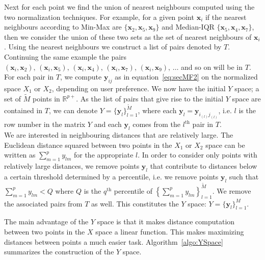 \documentclass[11pt]{article}
\begin{document}
Next for each point we find the union of nearest neighbours computed using the two normalization techniques. For example, for a given point $\bm{x}_i$ if the nearest neighbours according to Min-Max are $\{\bm{x}_2, \bm{x}_5, \bm{x}_9 \}$ and Median-IQR   $\{\bm{x}_5, \bm{x}_4, \bm{x}_7 \}$, then we consider the union of these two sets as the set of nearest neighbours of $\bm{x}_i$. Using the nearest neighbours we construct a list of pairs denoted by $T$. Continuing the same example the pairs $(\bm{x}_i, \bm{x}_2), \,  (\bm{x}_i, \bm{x}_5), \, (\bm{x}_i, \bm{x}_4), \,  (\bm{x}_i, \bm{x}_7), \, (\bm{x}_i, \bm{x}_9), \, \ldots $ and so on will be in $T$. \\

For each pair in $T$, we compute $\bm{y}_{ij}$ as in equation~\eqref{eq:secMF2} on the normalized space $X_1$ or $X_2$, depending on user preference. We now have the initial $Y$ space; a set of $\tilde{M}$ points in $\mathbb{R}^{p+}$. As the list of pairs that give rise to the initial $Y$ space are contained in $T$, we can denote $Y = \{ \bm{y}_l \}_{l=1}^{\tilde{M}}$, where each $\bm{y}_l = \bm{y}_{i_{(l)} j_{(l)} }$, i.e. $l$ is the row number in the matrix $Y$ and each $\bm{y}_l$ comes from the $l^{\text{th}}$ pair in $T$. \\

We are interested in neighbouring distances that are relatively large. The Euclidean distance squared between two points in the $X_1$ or $X_2$ space  can be written as $\sum_{m=1}^p y_{lm}$ for the appropriate $l$. In order to consider only points with relatively large distances, we remove points $\bm{y}_l$ that contribute to distances below a certain threshold determined by a percentile, i.e. we remove points $\bm{y}_l$ such that  $\sum_{m=1}^p y_{lm} < Q$ where $Q$ is the $q^{\text{th}}$ percentile of $ \left \{\sum_{m=1}^p y_{lm} \right \}_{l=1}^{\tilde{M}}$. We remove the associated pairs from $T$ as well. This constitutes the $Y$ space: $Y = \{\bm{y}_l \}_{l=1}^M$.

The main advantage of the $Y$ space is that it makes distance computation  between two points in the $X$ space a linear function. This makes maximizing distances between points a much easier task. 
Algorithm~\ref{algo:YSpace} summarizes the construction of the $Y$ space. 
\end{document}
